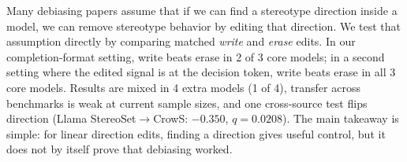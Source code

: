 Many debiasing papers assume that if we can find a stereotype direction inside a model, we can remove stereotype behavior by editing that direction. We test that assumption directly by comparing matched \emph{write} and \emph{erase} edits. In our completion-format setting, write beats erase in 2 of 3 core models; in a second setting where the edited signal is at the decision token, write beats erase in all 3 core models. Results are mixed in 4 extra models (1 of 4), transfer across benchmarks is weak at current sample sizes, and one cross-source test flips direction (Llama StereoSet$\rightarrow$CrowS: $-0.350$, $q=0.0208$). The main takeaway is simple: for linear direction edits, finding a direction gives useful control, but it does not by itself prove that debiasing worked.
